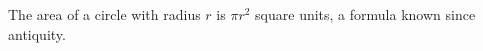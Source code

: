 \documentclass{article}
\begin{document}
The area of a circle with radius $r$ is $\pi r^2$ square units, a
formula known since antiquity.
\end{document}
